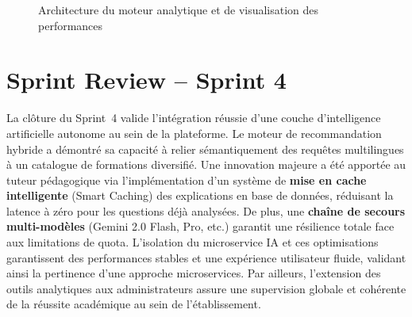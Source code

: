 \documentclass[12pt,a4paper]{report}
\begin{document}
\begin{figure}[H]
\centering
{}
\caption{Architecture du moteur analytique et de visualisation des performances}
\end{figure}

\section{Sprint Review -- Sprint 4}

La clôture du Sprint~4 valide l'intégration réussie d'une couche d'intelligence artificielle autonome au sein de la plateforme. Le moteur de recommandation hybride a démontré sa capacité à relier sémantiquement des requêtes multilingues à un catalogue de formations diversifié. Une innovation majeure a été apportée au tuteur pédagogique via l'implémentation d'un système de \textbf{mise en cache intelligente} (Smart Caching) des explications en base de données, réduisant la latence à zéro pour les questions déjà analysées. De plus, une \textbf{chaîne de secours multi-modèles} (Gemini 2.0 Flash, Pro, etc.) garantit une résilience totale face aux limitations de quota. L'isolation du microservice IA et ces optimisations garantissent des performances stables et une expérience utilisateur fluide, validant ainsi la pertinence d'une approche microservices. Par ailleurs, l'extension des outils analytiques aux administrateurs assure une supervision globale et cohérente de la réussite académique au sein de l'établissement.
\end{document}

